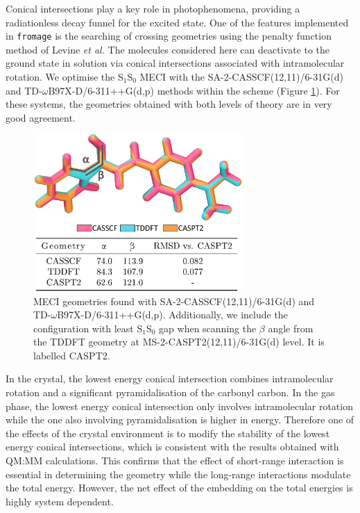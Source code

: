 Conical intersections play a key role in photophenomena, providing a radiationless decay funnel for the excited state. One of the features implemented in \texttt{fromage} is the searching of crossing geometries using the penalty function method of Levine \textit{et al.}\cite{Levine2008} The molecules considered here can deactivate to the ground state in solution via conical intersections associated with intramolecular rotation.\cite{Dommett2017a,Dommett2017c} We optimise  the S$_1$\textendash{}S$_0$ MECI with the SA-2-CASSCF(12,11)/6-31G(d) and TD-$\omega$B97X-D\slash{}6-311++G(d,p) methods within the \EEC{} scheme (Figure \ref{fig:ci}). For these systems, the geometries obtained with both levels of theory are in very good agreement. 



\begin{figure}
\centering
\includegraphics[width=8cm]{Chapters/5Ewald/ci_fig.pdf}
\caption{MECI geometries found with SA-2-CASSCF(12,11)/6-31G(d) and TD-$\omega$B97X-D\slash{}6-311++G(d,p). Additionally, we include the configuration with least S$_1$\textendash{}S$_0$ gap when scanning the $\beta$ angle from the TDDFT geometry at MS-2-CASPT2(12,11)/6-31G(d) level. It is labelled CASPT2.}
\label{fig:ci}
\end{figure}

In the crystal, the lowest energy conical intersection combines intramolecular rotation and a significant pyramidalisation of the carbonyl carbon.\cite{Dommett2017c} In the gas phase, the lowest energy conical intersection only involves intramolecular rotation while the one also involving pyramidalisation is higher in energy. Therefore one of the effects of the crystal environment is to modify the stability of the lowest energy conical intersections, which is consistent with the results obtained with QM:MM calculations. This confirms that the effect of short-range interaction is essential in determining the geometry while the long-range interactions modulate the total energy. However, the net effect of the embedding on the total energies is highly system dependent. 

